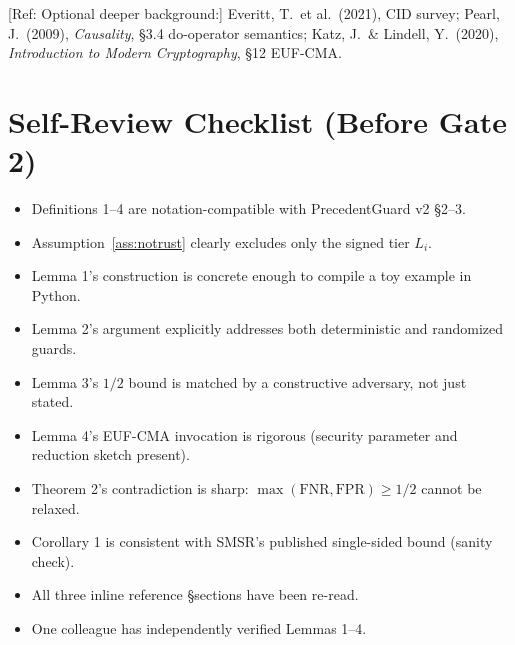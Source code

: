 \documentclass[11pt]{article}
\newcommand{\REF}[1]{{\color{teal}\textsf{[Ref: #1]}}}
\theoremstyle{plain}
\theoremstyle{definition}
\begin{document}
\REF{Optional deeper background:} Everitt, T.\ et al.\ (2021), CID survey;
Pearl, J.\ (2009), \textit{Causality}, \S 3.4 do-operator semantics;
Katz, J.\ \& Lindell, Y.\ (2020), \textit{Introduction to Modern Cryptography}, \S 12 EUF-CMA.

\section{Self-Review Checklist (Before Gate 2)}

\begin{itemize}[label=$\Box$, noitemsep]
  \item Definitions 1--4 are notation-compatible with PrecedentGuard v2 \S 2--3.
  \item Assumption~\ref{ass:notrust} clearly excludes only the signed tier $L_i$.
  \item Lemma 1's construction is concrete enough to compile a toy example in Python.
  \item Lemma 2's argument explicitly addresses both deterministic and randomized
        guards.
  \item Lemma 3's $1/2$ bound is matched by a constructive adversary, not just stated.
  \item Lemma 4's EUF-CMA invocation is rigorous (security parameter and reduction
        sketch present).
  \item Theorem 2's contradiction is sharp: $\max(\mathrm{FNR}, \mathrm{FPR}) \ge 1/2$
        cannot be relaxed.
  \item Corollary 1 is consistent with SMSR's published single-sided bound
        (sanity check).
  \item All three inline reference \S sections have been re-read.
  \item One colleague has independently verified Lemmas 1--4.
\end{itemize}
\end{document}
